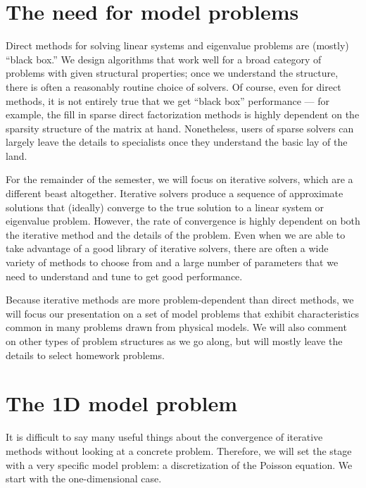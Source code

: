 \documentclass[12pt, leqno]{article} %
\begin{document}

\section{The need for model problems}

Direct methods for solving linear systems and eigenvalue problems are
(mostly) ``black box.''  We design algorithms that work well for a
broad category of problems with given structural properties; once we
understand the structure, there is often a reasonably routine choice
of solvers.  Of course, even for direct methods, it is not entirely
true that we get ``black box'' performance --- for example, the fill
in sparse direct factorization methods is highly dependent on the
sparsity structure of the matrix at hand.  Nonetheless, users of
sparse solvers can largely leave the details to specialists once they
understand the basic lay of the land.

For the remainder of the semester, we will focus on iterative solvers,
which are a different beast altogether.  Iterative solvers produce a
sequence of approximate solutions that (ideally) converge to the true
solution to a linear system or eigenvalue problem.  However, the rate
of convergence is highly dependent on both the iterative method and
the details of the problem.  Even when we are able to take advantage
of a good library of iterative solvers, there are often a wide variety
of methods to choose from and a large number of parameters that we need
to understand and tune to get good performance.

Because iterative methods are more problem-dependent than direct methods,
we will focus our presentation on a set of model problems that exhibit
characteristics common in many problems drawn from physical models.
We will also comment on other types of problem structures as we go along,
but will mostly leave the details to select homework problems.

\section{The 1D model problem}

It is difficult to say many useful
things about the convergence of iterative methods without looking at a
concrete problem.  Therefore, we will set the stage with a very
specific model problem: a discretization of the Poisson equation.
We start with the one-dimensional case.
\end{document}

